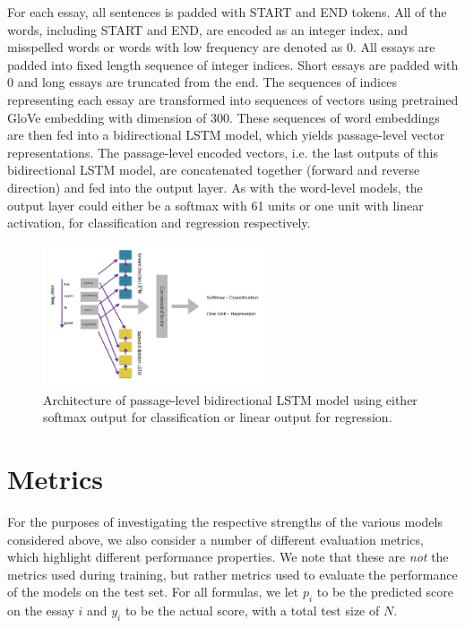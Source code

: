 \documentclass[10pt,psamsfonts]{amsart}
\theoremstyle{definition}
\theoremstyle{remark}
\numberwithin{equation}{section}
\begin{document}
For each essay, all sentences is padded with START and END tokens. All of the words, including START and END, are encoded as an integer index, and misspelled words or words with low frequency are denoted as 0. All essays are padded into fixed length sequence of integer indices. Short essays are padded with 0 and long essays are truncated from the end. The sequences of indices representing each essay are transformed into sequences of vectors using pretrained GloVe embedding with dimension of 300. These sequences of word embeddings are then fed into a bidirectional LSTM model, which yields passage-level vector representations. The passage-level encoded vectors, i.e. the last outputs of this bidirectional LSTM model, are concatenated together (forward and reverse direction) and fed into the output layer. As with the word-level models, the output layer could either be a softmax with 61 units or one unit with linear activation, for classification and regression respectively.

\begin{figure}
	\includegraphics[width=0.6\textwidth]{bilstm.png}
	\caption{Architecture of passage-level bidirectional LSTM model using either softmax output for classification or linear output for regression.}
	\label{fig:bilstm}
\end{figure}

\section*{Metrics}

For the purposes of investigating the respective strengths of the various models considered above, we also consider a number of different evaluation metrics, which highlight different performance properties. We note that these are {\em not} the metrics used during training, but rather metrics used to evaluate the performance of the models on the test set. For all formulas, we let $p_i$ to be the predicted score on the essay $i$ and $y_i$ to be the actual score, with a total test size of $N$.
\end{document}
